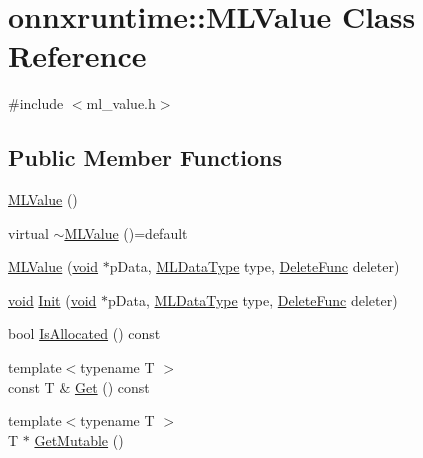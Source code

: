 \hypertarget{classonnxruntime_1_1MLValue}{}\section{onnxruntime\+:\+:M\+L\+Value Class Reference}
\label{classonnxruntime_1_1MLValue}


{\ttfamily \#include $<$ml\+\_\+value.\+h$>$}

\subsection*{Public Member Functions}
\begin{DoxyCompactItemize}
\item 
\mbox{\hyperlink{classonnxruntime_1_1MLValue_ae9ed3dcdbcf9a6189e4afca9f007652e}{M\+L\+Value}} ()
\item 
virtual \mbox{\hyperlink{classonnxruntime_1_1MLValue_a0e138dfc687d26850bf909ece43caeb0}{$\sim$\+M\+L\+Value}} ()=default
\item 
\mbox{\hyperlink{classonnxruntime_1_1MLValue_ac21e08ad0eb4ed195c82c8ced739ffc3}{M\+L\+Value}} (\mbox{\hyperlink{mlasi_8h_a88f941d423cb2a819b70a1358982b1a6}{void}} $\ast$p\+Data, \mbox{\hyperlink{namespaceonnxruntime_ad77d0a6e838ec7da5dc35fed5ee66b49}{M\+L\+Data\+Type}} type, \mbox{\hyperlink{namespaceonnxruntime_a8dcea0e1aa8476e3d09d5a44a0ca4516}{Delete\+Func}} deleter)
\item 
\mbox{\hyperlink{mlasi_8h_a88f941d423cb2a819b70a1358982b1a6}{void}} \mbox{\hyperlink{classonnxruntime_1_1MLValue_a082b73bfb1ef79b7e9b9dab2026c41e7}{Init}} (\mbox{\hyperlink{mlasi_8h_a88f941d423cb2a819b70a1358982b1a6}{void}} $\ast$p\+Data, \mbox{\hyperlink{namespaceonnxruntime_ad77d0a6e838ec7da5dc35fed5ee66b49}{M\+L\+Data\+Type}} type, \mbox{\hyperlink{namespaceonnxruntime_a8dcea0e1aa8476e3d09d5a44a0ca4516}{Delete\+Func}} deleter)
\item 
bool \mbox{\hyperlink{classonnxruntime_1_1MLValue_ad4f380ab452877a2d689b6d384e80617}{Is\+Allocated}} () const
\item 
{\footnotesize template$<$typename T $>$ }\\const T \& \mbox{\hyperlink{classonnxruntime_1_1MLValue_a98afe490bedddb4d7b4f263136d43a54}{Get}} () const
\item 
{\footnotesize template$<$typename T $>$ }\\T $\ast$ \mbox{\hyperlink{classonnxruntime_1_1MLValue_ab1dbc96cd2d5912163aeb13ca5da0a5e}{Get\+Mutable}} ()

\end{DoxyCompactItemize}

